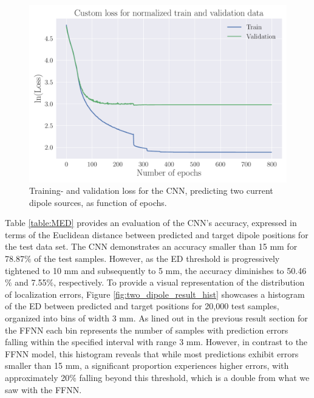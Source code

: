 \documentclass[a4paper, UKenglish, 11pt]{uiomaster}
\begin{document}
\begin{figure}[!htb]
    \centering
    \includegraphics[width=\linewidth]{figures/CNN/Custom_Loss_simple_last_run_old_std_2_dipoles_32_0.001_0.35_0.5_0_800_(0).pdf}
    \caption{Training- and validation loss for the CNN, predicting two current dipole sources, as function of epochs.}
    \label{fig:two_dipole_result_CNN}
\end{figure}

\FloatBarrier

Table \ref{table:MED} provides an evaluation of the CNN's accuracy, expressed in terms of the Euclidean distance between predicted and target dipole positions for the test data set. The CNN demonstrates an accuracy smaller than 15 mm for 78.87$\%$ of the test samples. However, as the ED threshold is progressively tightened to 10 mm and subsequently to 5 mm, the accuracy diminishes to 50.46$\%$ and 7.55$\%$, respectively. To provide a visual representation of the distribution of localization errors, Figure \ref{fig:two_dipole_result_hist} showcases a histogram of the ED between predicted and target positions for 20,000 test samples, organized into bins of width 3 mm. As lined out in the previous result section for the FFNN each bin represents the number of samples with prediction errors falling within the specified interval with range 3 mm. However, in contrast to the FFNN model, this histogram reveals that while most predictions exhibit errors smaller than 15 mm, a significant proportion experiences higher errors, with approximately 20$\%$ falling beyond this threshold, which is a double from what we saw with the FFNN.
\end{document}
